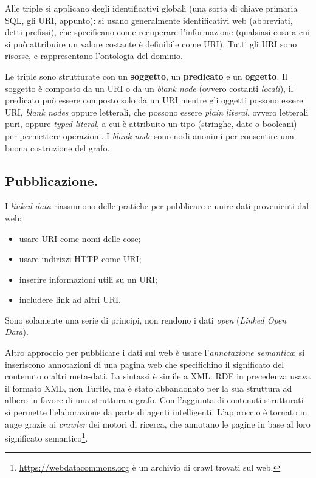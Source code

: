 \documentclass[11pt]{article}
\begin{document}
\begin{multicols}{2}
Alle triple si applicano degli identificativi globali (una sorta di chiave primaria SQL, gli URI, appunto): si usano generalmente identificativi web (abbreviati, detti prefissi), che specificano come recuperare l'informazione (qualsiasi cosa a cui si può attribuire un valore costante è definibile come URI).
Tutti gli URI sono risorse, e rappresentano l'ontologia del dominio.

Le triple sono strutturate con un \textbf{soggetto}, un \textbf{predicato} e un \textbf{oggetto}.
Il soggetto è composto da un URI o da un \textit{blank node} (ovvero costanti \textit{locali}), il predicato può essere composto solo da un URI mentre gli oggetti possono essere URI, \textit{blank nodes} oppure letterali, che possono essere \textit{plain literal}, ovvero letterali puri, oppure \textit{typed literal}, a cui è attribuito un tipo (stringhe, date o booleani) per permettere operazioni.
I \textit{blank node} sono nodi anonimi per consentire una buona costruzione del grafo.

\subsection{Pubblicazione.}
I \textit{linked data} riassumono delle pratiche per pubblicare e unire dati provenienti dal web:
\begin{itemize}
  \item usare URI come nomi delle cose;
  \item usare indirizzi HTTP come URI;
  \item inserire informazioni utili su un URI;
  \item includere link ad altri URI.
\end{itemize}
Sono solamente una serie di principi, non rendono i dati \textit{open} (\textit{Linked Open Data}). \newline

Altro approccio per pubblicare i dati sul web è usare l'\textit{annotazione semantica}: si inseriscono annotazioni di una pagina web che specifichino il significato del contenuto o altri meta-dati.
La sintassi è simile a XML: RDF in precedenza usava il formato XML, non Turtle, ma è stato abbandonato per la sua struttura ad albero in favore di una struttura a grafo.
Con l'aggiunta di contenuti strutturati si permette l'elaborazione da parte di agenti intelligenti.
L'approccio è tornato in auge grazie ai \textit{crawler} dei motori di ricerca, che annotano le pagine in base al loro significato semantico\footnote{\url{https://webdatacommons.org} è un archivio di crawl trovati sul web.}.


\end{multicols}
\end{document}
